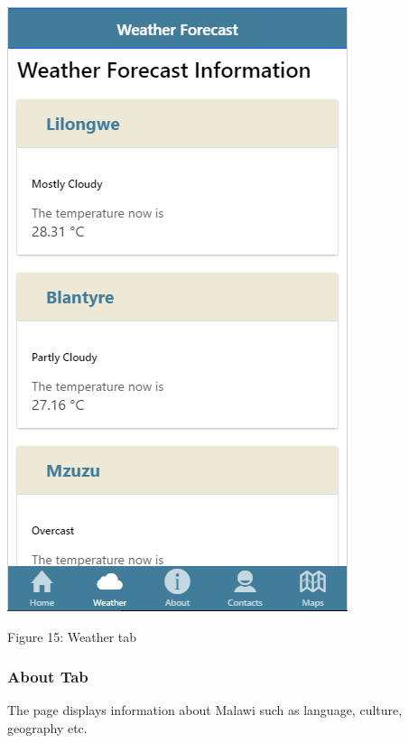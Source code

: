 \begin{center}    
	\includegraphics{img/weather.png}
\end{center}
\begin{center}
	Figure 15: Weather tab 
\end{center}
\paragraph{}

\subsubsection{About Tab}
The page displays information about Malawi such as language, culture, geography etc.

